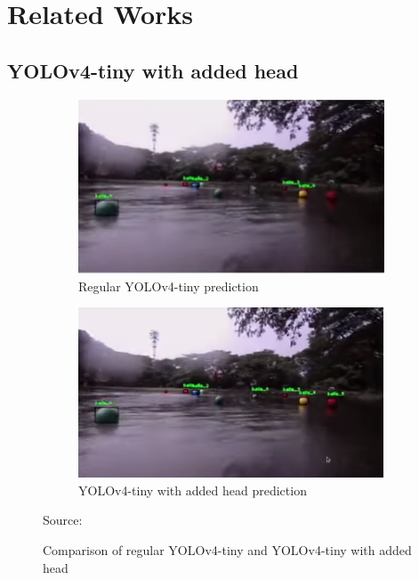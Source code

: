 \section{Related Works}
\label{section:relatedwork}

  \subsection{YOLOv4-tiny with added head}%

  \begin{figure}[p]
    \hfill%
    \begin{subfigure}[c][][c]{.45\textwidth}
        \includegraphics[width=1\linewidth]{figures/yolov4barun-regular.png}
        \caption{Regular YOLOv4-tiny prediction}
        \label{fig:barun-yolov4}
    \end{subfigure}\hfill  
    \begin{subfigure}[c][][c]{.45\textwidth}
        \includegraphics[width=1\linewidth]{figures/yolov4barun-addhead.png}
        \caption{YOLOv4-tiny with added head prediction}
        \label{fig:barun-yolov4-3l}
    \end{subfigure}\hfill%
    \caption*{Source: \textcite{barunastra}}
    \caption{Comparison of regular YOLOv4-tiny and YOLOv4-tiny with added head}
    \label{fig:barun}
  \end{figure}

